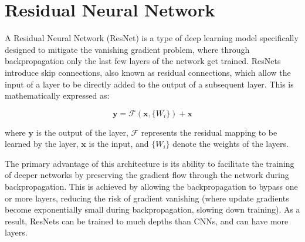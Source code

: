 





\section{Residual Neural Network}


A Residual Neural Network (ResNet) is a type of deep learning model specifically designed to mitigate the vanishing gradient problem, where through backpropagation only the last few layers of the network get trained. ResNets introduce skip connections, also known as residual connections, which allow the input of a layer to be directly added to the output of a subsequent layer. This is mathematically expressed as:

\[
	\mathbf{y} = \mathcal{F}(\mathbf{x}, \{W_i\}) + \mathbf{x}
\]

where $\mathbf{y}$ is the output of the layer, $\mathcal{F}$ represents the residual mapping to be learned by the layer, $\mathbf{x}$ is the input, and $\{W_i\}$ denote the weights of the layers.

The primary advantage of this architecture is its ability to facilitate the training of deeper networks by preserving the gradient flow through the network during backpropagation. This is achieved by allowing the backpropagation to bypass one or more layers, reducing the risk of gradient vanishing (where update gradients become exponentially small during backpropagation, slowing down training). As a result, ResNets can be trained to much depths than CNNs, and can have more layers.




